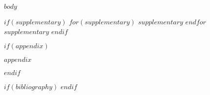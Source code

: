 \documentclass[pdflatex,iicol,sn-vancouver]{sn-jnl}%
\begin{document}



\maketitle

$body$


$if(supplementary)$
\backmatter
$for(supplementary)$
$supplementary$
$endfor$
$supplementary$
$endif$

$if(appendix)$
\begin{appendices}

$appendix$




\end{appendices}
$endif$


$if(bibliography)$
$endif$

\end{document}
